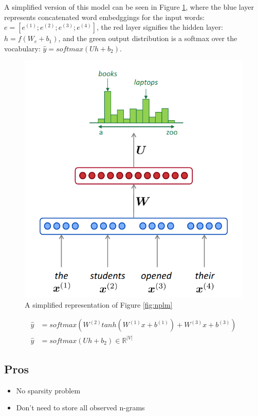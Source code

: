 \documentclass[letterpaper]{article}
\begin{document}
A simplified version of this model can be seen in Figure
\ref{fig:nplmsimple}, where the blue layer represents
concatenated word embedggings for the input words:
$e = [e^{(1)};e^{(2)};e^{(3)};e^{(4)}]$, the red layer signifies
the hidden layer: $h = f(W_e + b_1)$, and the green output distribution
is a softmax over the vocabulary: $\hat{y} = softmax(Uh + b_2)$.


\begin{figure}
	\includegraphics[scale=0.4]{images/Simplified_Neural_Language_Model.png}
	\caption{A simplified representation of Figure \ref{fig:nplm}}
	\label{fig:nplmsimple}
\end{figure}

\begin{align}
	\hat{y} &= softmax(W^{(2)}tanh(W^{(1)}x 
			+  b^{(1)}) + W^{(3)}x + b^{(3)}) \label{eq:nplm} \\
	\hat{y} &= softmax(Uh + b_2) \in \mathbb{R}^{|V|} \label{eq:nplmsimple} 
\end{align}


\subsection{Pros}
\begin{itemize}
	\item No sparsity problem
	\item Don't need to store all observed n-grams
\end{itemize}
\end{document}
